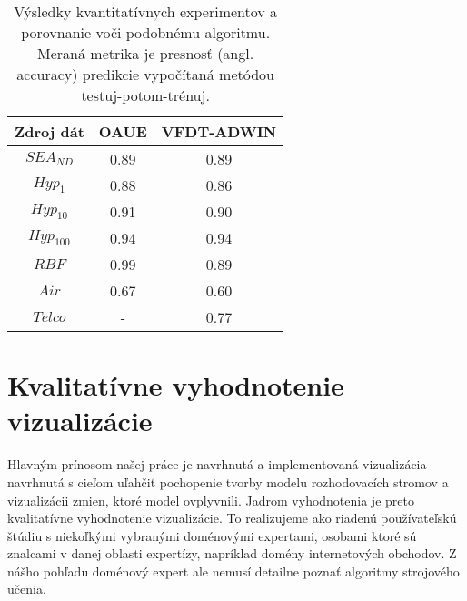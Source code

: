 \label{fig:synthetic-7k}

\label{fig:real_7k}

\begin{table}[!htp]
\centering
\begin{tabular}{| c || c | c |}
\hline
\textbf{Zdroj dát} & \textbf{OAUE} & \textbf{VFDT-ADWIN} \\ \hline

$SEA_{ND}$ & 0.89 & 0.89 \\ \hline
$Hyp_1$ & 0.88 & 0.86 \\ \hline
$Hyp_{10}$ & 0.91 & 0.90 \\ \hline
$Hyp_{100}$ & 0.94 & 0.94 \\ \hline
$RBF$ & 0.99 & 0.89 \\ \hline
$Air$ & 0.67 & 0.60 \\ \hline
$Telco$ & - & 0.77 \\ \hline

\end{tabular}
\caption{Výsledky kvantitatívnych experimentov a porovnanie voči podobnému algoritmu. Meraná metrika je presnosť (angl. accuracy) predikcie vypočítaná metódou testuj-potom-trénuj.}
\label{tab-method-results}
\end{table}


\clearpage
\section{Kvalitatívne vyhodnotenie vizualizácie}
Hlavným prínosom našej práce je navrhnutá a implementovaná vizualizácia navrhnutá s cieľom uľahčiť pochopenie tvorby modelu rozhodovacích stromov a vizualizácii zmien, ktoré model ovplyvnili. Jadrom vyhodnotenia je preto kvalitatívne vyhodnotenie vizualizácie. To realizujeme ako riadenú používateľskú štúdiu s niekoľkými vybranými doménovými expertami, osobami ktoré sú znalcami v danej oblasti expertízy, napríklad domény internetových obchodov. Z nášho pohľadu doménový expert ale nemusí detailne poznať algoritmy strojového učenia.

